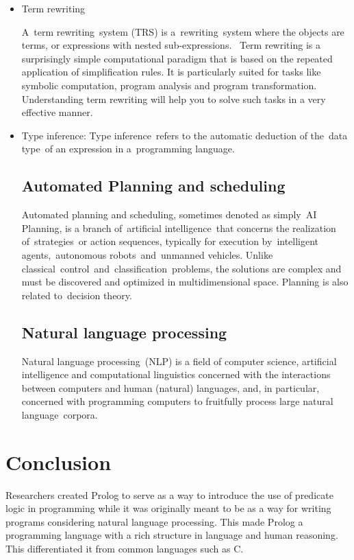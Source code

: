 \documentclass[14pt]{article}
\begin{document}
\begin{itemize}
\item Term rewriting

A term rewriting system (TRS) is a rewriting system where the 
objects are terms, or expressions with nested sub-expressions. 
Term rewriting is a surprisingly simple computational paradigm
that is based on the repeated application of simplification rules.
It is particularly suited for tasks like symbolic computation,
program analysis and program transformation. Understanding term 
rewriting will help you to solve such tasks in a very effective manner.

\item Type inference: 
Type inference refers to the automatic deduction of the data type of an
expression in a programming language.

\subsection{Automated Planning and scheduling}

Automated planning and scheduling, sometimes denoted as simply AI 
Planning, is a branch of artificial intelligence that concerns the 
realization of strategies or action sequences, typically for execution
by intelligent agents, autonomous robots and unmanned vehicles. Unlike
classical control and classification problems, the solutions are complex
and must be discovered and optimized in multidimensional space. Planning
is also related to decision theory.

\subsection{Natural language processing}

Natural language processing (NLP) is a field of computer science,
artificial intelligence and computational linguistics concerned with the
interactions between computers and human (natural) languages, and, in
particular, concerned with programming computers to fruitfully process
large natural language corpora.

\end{itemize}
\newpage 
\section{Conclusion}
Researchers created Prolog to serve as a way to introduce the use of
predicate logic in programming while it was originally meant to be as
a way for writing programs considering natural language processing.
This made Prolog a programming language with a rich structure in
language and human reasoning. This differentiated it from common
languages such as C.
\end{document}

